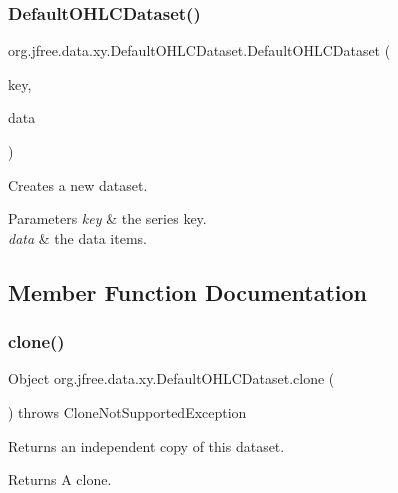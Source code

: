 \subsubsection{\texorpdfstring{Default\+O\+H\+L\+C\+Dataset()}{DefaultOHLCDataset()}}
{\footnotesize\ttfamily org.\+jfree.\+data.\+xy.\+Default\+O\+H\+L\+C\+Dataset.\+Default\+O\+H\+L\+C\+Dataset (\begin{DoxyParamCaption}\item[{Comparable}]{key,  }\item[{\mbox{\hyperlink{classorg_1_1jfree_1_1data_1_1xy_1_1_o_h_l_c_data_item}{O\+H\+L\+C\+Data\+Item}} \mbox{[}$\,$\mbox{]}}]{data }\end{DoxyParamCaption})}

Creates a new dataset.


\begin{DoxyParams}{Parameters}
{\em key} & the series key. \\
\hline
{\em data} & the data items. \\
\hline
\end{DoxyParams}


\subsection{Member Function Documentation}
\mbox{\label{classorg_1_1jfree_1_1data_1_1xy_1_1_default_o_h_l_c_dataset_a1a79c2747da3aac248beb7f74eadb60f}} 
\subsubsection{\texorpdfstring{clone()}{clone()}}
{\footnotesize\ttfamily Object org.\+jfree.\+data.\+xy.\+Default\+O\+H\+L\+C\+Dataset.\+clone (\begin{DoxyParamCaption}{ }\end{DoxyParamCaption}) throws Clone\+Not\+Supported\+Exception}

Returns an independent copy of this dataset.

\begin{DoxyReturn}{Returns}
A clone.
\end{DoxyReturn}

